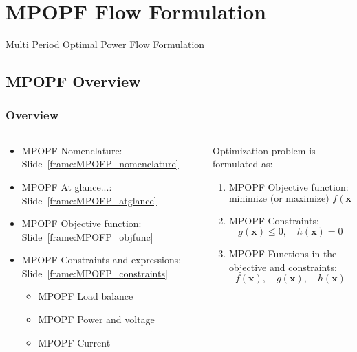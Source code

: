 \documentclass[
	11pt, %
	aspectratio=169, %
]{beamer}
\begin{document}
\section{MPOPF Flow Formulation} %

\begin{frame}
    \centering
    \LARGE
    Multi Period Optimal Power Flow Formulation
\end{frame}


\subsection{MPOPF Overview}

\begin{frame}
	\frametitle{Overview}
	
	\begin{columns}
		\begin{column}{0.5\textwidth}
			\begin{itemize}
				\item MPOPF Nomenclature: Slide~\ref{frame:MPOFP_nomenclature}
				\item MPOPF At glance...: Slide~\ref{frame:MPOFP_atglance}
				\item MPOPF Objective function: Slide~\ref{frame:MPOFP_objfunc}
				\item MPOPF Constraints and expressions: Slide~\ref{frame:MPOFP_constraints}
					\begin{itemize}
						\item MPOPF Load balance
						\item MPOPF Power and voltage
						\item MPOPF Current
					\end{itemize}
			\end{itemize}
		\end{column}

		\begin{column}{0.5\textwidth}
			Optimization problem is formulated as:
			\begin{enumerate}
				\item MPOPF Objective function:
				\[
					\text{minimize (or maximize) } f(\mathbf{x})
				\]
				\item MPOPF Constraints:
				\[
					g(\mathbf{x}) \leq 0, \quad h(\mathbf{x}) = 0
				\]
				\item MPOPF Functions in the objective and constraints:
				\[
					f(\mathbf{x}), \quad g(\mathbf{x}), \quad h(\mathbf{x})
				\]
			\end{enumerate}
		\end{column}
	\end{columns}
\end{frame}
\end{document}
